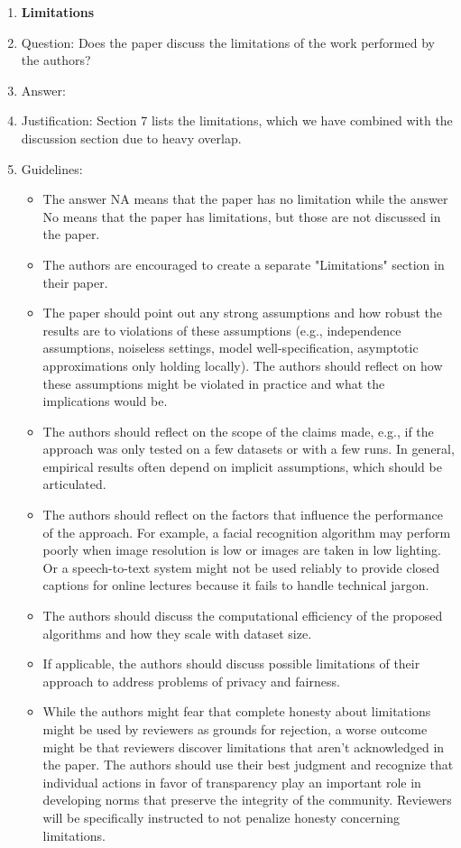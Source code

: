 \documentclass{article}
\begin{document}
\begin{enumerate}
\item {\bf Limitations}
    \item[] Question: Does the paper discuss the limitations of the work performed by the authors?
    \item[] Answer: \answerYes{} %
    \item[] Justification: Section 7 lists the limitations, which we have combined with the discussion section due to heavy overlap.
    \item[] Guidelines:
    \begin{itemize}
        \item The answer NA means that the paper has no limitation while the answer No means that the paper has limitations, but those are not discussed in the paper. 
        \item The authors are encouraged to create a separate "Limitations" section in their paper.
        \item The paper should point out any strong assumptions and how robust the results are to violations of these assumptions (e.g., independence assumptions, noiseless settings, model well-specification, asymptotic approximations only holding locally). The authors should reflect on how these assumptions might be violated in practice and what the implications would be.
        \item The authors should reflect on the scope of the claims made, e.g., if the approach was only tested on a few datasets or with a few runs. In general, empirical results often depend on implicit assumptions, which should be articulated.
        \item The authors should reflect on the factors that influence the performance of the approach. For example, a facial recognition algorithm may perform poorly when image resolution is low or images are taken in low lighting. Or a speech-to-text system might not be used reliably to provide closed captions for online lectures because it fails to handle technical jargon.
        \item The authors should discuss the computational efficiency of the proposed algorithms and how they scale with dataset size.
        \item If applicable, the authors should discuss possible limitations of their approach to address problems of privacy and fairness.
        \item While the authors might fear that complete honesty about limitations might be used by reviewers as grounds for rejection, a worse outcome might be that reviewers discover limitations that aren't acknowledged in the paper. The authors should use their best judgment and recognize that individual actions in favor of transparency play an important role in developing norms that preserve the integrity of the community. Reviewers will be specifically instructed to not penalize honesty concerning limitations.
    \end{itemize}


\end{enumerate}
\end{document}
